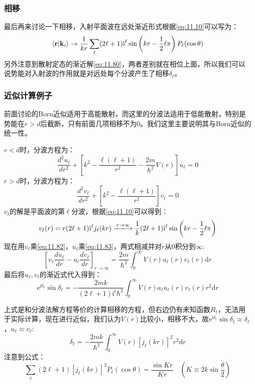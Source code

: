\documentclass[a4paper,zihao=-4,linespread=1]{ctexrep}
\begin{document}
	\subsubsection{相移}
	最后再来讨论一下相移，入射平面波在远处渐近形式根据\ref{eq:11.10}可以写为：
	\[\braket{\mathbf{r}|\mathbf{k}_i}\to\frac{1}{kr}\sum_\ell(2\ell+1)\mathrm{i}^\ell\sin\left(kr-\frac{1}{2}\ell\pi\right)P_\ell(\cos\theta)\]
	另外注意到散射定态的渐近解\ref{eq:11.80}，两者差别就在相位上面，所以我们可以说势能对入射波的作用就是对远处每个分波产生了相移$\delta_\ell$。
	\subsubsection{近似计算例子}
	前面讨论的Born近似适用于高能散射，而这里的分波法适用于低能散射，特别是势能在$r>d$后截断，只有前面几项相移不为$0$。我们这里主要说明其与Born近似的统一性。
	
	$r<d$时，分波方程为：
	\begin{equation}
		\label{eq:11.82}
		\frac{d^2u_\ell}{dr^2}+\left[k^2-\frac{\ell(\ell+1)}{r^2}-\frac{2m}{\hbar^2}V(r)\right]u_\ell=0
	\end{equation}
		$r>d$时，分波方程为：
	\begin{equation}
		\label{eq:11.83}
		\frac{d^2v_\ell}{dr^2}+\left[k^2-\frac{\ell(\ell+1)}{r^2}\right]v_\ell=0
	\end{equation}
	$v_\ell$的解是平面波的第$\ell$分波，根据\ref{eq:11.10}可以得到：
	\[v_\ell(r)=r(2\ell+1)\mathrm{i}^\ell j_\ell(kr)\xlongrightarrow{r\to\infty}\frac{1}{k}(2\ell+1)\mathrm{i}^\ell\sin\left(kr-\frac{1}{2}\ell\pi\right)\]
	现在用$v_\ell$乘\ref{eq:11.82}，$u_\ell$乘\ref{eq:11.83}，两式相减并对$r$从$0$积分到$\infty$:
	\[\left[v_\ell\frac{du_\ell}{dr}-u_\ell\frac{dv_\ell}{dr}\right]_{r\to\infty}=\frac{2m}{\hbar^2}\int_0^\infty V(r) u_\ell(r)v_\ell(r)\mathrm{d}r\]
	最后将$u_\ell,v_\ell$的渐近式代入得到：
	\begin{equation}
		\mathrm{e}^{\mathrm{i}\delta_\ell}\sin\delta_\ell=-\frac{2mk}{(2\ell+1)\mathrm{i}^\ell\hbar^2}\int_0^\infty V(r)a_\ell u_\ell(r)v_\ell(r)r^2\mathrm{d}r
	\end{equation}
	
	上式是和分波法解方程等价的计算相移的方程，但右边仍有未知函数$R_\ell$，无法用于实际计算，现在进行近似，我们认为$V(r)$比较小，相移不大，故$\mathrm{e}^{\mathrm{i}\delta_\ell}\sin\delta_\ell\approx \delta_\ell$，$u_\ell\approx v_\ell$:
	\begin{equation}
		\label{eq:11.85}
		\delta_\ell=-\frac{2mk}{\hbar^2}\int_0^\infty V(r) \left[j_\ell(kr)\right]^2r^2\mathrm{d}r
	\end{equation}
	注意到公式：
	\[\sum_\ell(2\ell+1)\left[j_\ell(kr)\right]^2P_\ell(\cos\theta)=\frac{\sin Kr}{Kr}\quad(K\equiv2k\sin\frac{\theta}{2})\]
	
\end{document}
